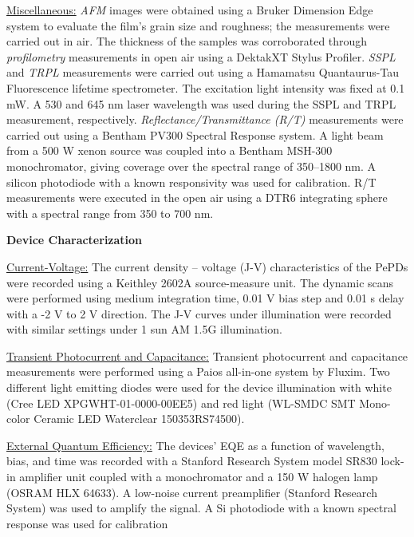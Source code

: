 \underline{Miscellaneous:} \textit{AFM} images were obtained using a Bruker Dimension Edge system to evaluate the film’s grain size and roughness; the measurements were carried out in air. The thickness of the samples was corroborated through \textit{profilometry} measurements in open air using a DektakXT Stylus Profiler. \textit{SSPL} and \textit{TRPL} measurements were carried out using a Hamamatsu Quantaurus-Tau Fluorescence lifetime spectrometer. The excitation light intensity was fixed at 0.1 mW. A 530 and 645 nm laser wavelength was used during the SSPL and TRPL measurement, respectively. \textit{Reflectance/Transmittance (R/T)} measurements were carried out using a Bentham PV300 Spectral Response system. A light beam from a 500 W xenon source was coupled into a Bentham MSH-300 monochromator, giving coverage over the spectral range of 350–1800 nm. A silicon photodiode with a known responsivity was used for calibration. R/T measurements were executed in the open air using a DTR6 integrating sphere with a spectral range from 350 to 700 nm.

\textbf{Device Characterization}

\underline{Current-Voltage:} The current density – voltage (J-V) characteristics of the PePDs were recorded using a Keithley 2602A source-measure unit. The dynamic scans were performed using medium integration time, 0.01 V bias step and 0.01 s delay with a -2 V to 2 V direction. The J-V curves under illumination were recorded with similar settings under 1 sun AM 1.5G illumination. 

\underline{Transient Photocurrent and Capacitance:} Transient photocurrent and capacitance measurements were performed using a Paios all-in-one system by Fluxim. Two different light emitting diodes were used for the device illumination with white (Cree LED XPGWHT-01-0000-00EE5) and red light (WL-SMDC SMT Mono-color Ceramic LED Waterclear 150353RS74500).

\underline{External Quantum Efficiency:} The devices' EQE as a function of wavelength, bias, and time was recorded with a Stanford Research System model SR830 lock-in amplifier unit coupled with a monochromator and a 150 W halogen lamp (OSRAM HLX 64633). A low-noise current preamplifier (Stanford Research System) was used to amplify the signal. A Si photodiode with a known spectral response was used for calibration



\cleardoublepage

